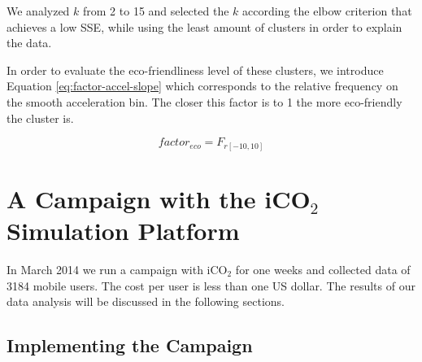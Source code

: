 \documentclass[preprint,authoryear,12pt]{elsarticle}
\begin{document}
We analyzed $k$ from 2 to 15 and selected the $k$ according the elbow criterion \cite{Thorndike.1953} that achieves a low SSE, while using the least amount of clusters in order to explain the data. 

In order to evaluate the eco-friendliness level of these clusters, we introduce Equation \ref{eq:factor-accel-slope} which corresponds to the relative frequency on the smooth acceleration bin. The closer this factor is to 1 the more eco-friendly the cluster is.

\begin{equation}\label{eq:factor-accel-slope}
factor_{eco} = F_{r[-10,10]}
\end{equation}



\section{A Campaign with the iCO$_2$ Simulation Platform}\label{sec:campaign}


In March 2014 we run a campaign with iCO$_2$ for one weeks and collected data of 3184 mobile users. The cost per user is less than one US dollar.
The results of our data analysis will be discussed in the following sections.

\subsection{Implementing the Campaign}
\label{subsec:campaign}
\end{document}
